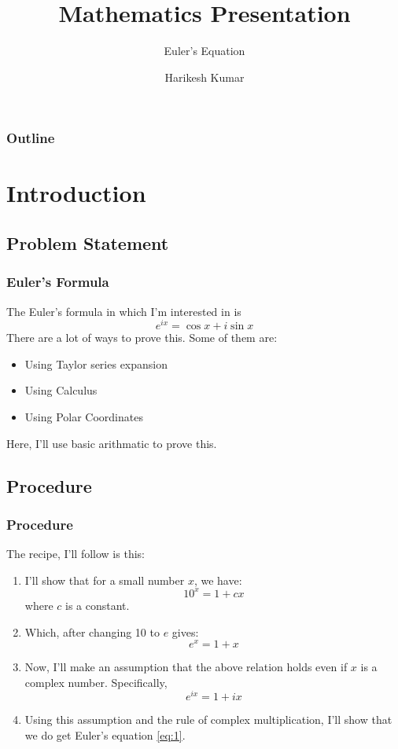 \documentclass{beamer}
\title{Mathematics Presentation}
\subtitle{Euler's Equation}
\institute[IITD]{Indian Institute of Technology, Delhi}
\author{Harikesh Kumar}
\begin{document}
\maketitle
\begin{frame}
\frametitle{Outline}
\tableofcontents
\end{frame}
\label{Intro}
\section{Introduction}
\subsection{Problem Statement}
\begin{frame}
\frametitle{Euler's Formula}
The Euler's formula in which I'm interested in is
\begin{equation}
    \label{eq:1}
        e^{ix} = \cos{x} + i\sin{x}
\end{equation}
There are a lot of ways to prove this. Some of them are:
\begin{itemize}
\color{blue}
\item <2-> Using Taylor series expansion
\item <3-> Using Calculus
\item <4-> Using Polar Coordinates
\end{itemize}
 Here, I'll use basic arithmatic to prove this.
\end{frame}
\subsection{Procedure}
\begin{frame}
    \frametitle{Procedure}
    The recipe, I'll follow is this:
    \begin{enumerate}
        \item <1->  I'll show that for a small number $x$, we have: $$ 10^x = 1 + cx$$ where $c$ is a constant.
        \item <2-> Which, after changing 10 to $e$ gives: $$ e^x = 1+x$$
        \item <3-> Now, I'll make an assumption that the above relation holds even if $x$ is a complex number. Specifically, $$e^{ix} = 1+ix$$
        \item <4-> Using this assumption and the rule of complex multiplication, I'll show that we do get Euler's equation \ref{eq:1}.
    \end{enumerate}
\end{frame}
\end{document}
